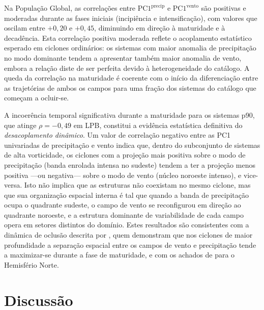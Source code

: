 

Na População Global, as correlações entre $\text{PC1}^{\text{precip}}$ e $\text{PC1}^{\text{vento}}$ são positivas e moderadas durante as fases iniciais (incipiência e intensificação), com valores que oscilam entre $+0,20$ e $+0,45$, diminuindo em direção à maturidade e à decadência. Esta correlação positiva moderada reflete o acoplamento estatístico esperado em ciclones ordinários: os sistemas com maior anomalia de precipitação no modo dominante tendem a apresentar também maior anomalia de vento, embora a relação diste de ser perfeita devido à heterogeneidade do catálogo. A queda da correlação na maturidade é coerente com o início da diferenciação entre as trajetórias de ambos os campos para uma fração dos sistemas do catálogo que começam a ocluir-se.

A incoerência temporal significativa durante a maturidade para os sistemas p90, que atinge $\rho = -0,49$ em LPB, constitui a evidência estatística definitiva do \textit{desacoplamento dinâmico}. Um valor de correlação negativo entre as PC1 univariadas de precipitação e vento indica que, dentro do subconjunto de sistemas de alta vorticidade, os ciclones com a projeção mais positiva sobre o modo de precipitação (banda enrolada intensa no sudeste) tendem a ter a projeção menos positiva ---ou negativa--- sobre o modo de vento (núcleo noroeste intenso), e vice-versa. Isto não implica que as estruturas não coexistam no mesmo ciclone, mas que sua organização espacial interna é tal que quando a banda de precipitação ocupa o quadrante sudeste, o campo de vento se reconfigurou em direção ao quadrante noroeste, e a estrutura dominante de variabilidade de cada campo opera em setores distintos do domínio. Estes resultados são consistentes com a dinâmica de oclusão descrita por \citet{sinclair2023relationship}, quem demonstram que nos ciclones de maior profundidade a separação espacial entre os campos de vento e precipitação tende a maximizar-se durante a fase de maturidade, e com os achados de \citet{chen2025characteristics} para o Hemisfério Norte.

\section{Discussão}
\label{sec:discusion_meof}

